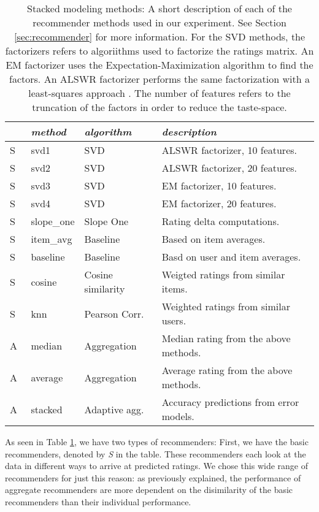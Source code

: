 \begin{table}[t]
  \begin{tabular*}{\textwidth}{ l l l l }
    \toprule
    ~ & \emph{method} &  \emph{algorithm} & \emph{description} \\
    \midrule
    S & svd1          & SVD                   & ALSWR factorizer, 10 features. \\
    S & svd2          & SVD                   & ALSWR factorizer, 20 features. \\
    S & svd3          & SVD                   & EM factorizer, 10 features. \\
    S & svd4          & SVD                   & EM factorizer, 20 features. \\
    S & slope\_one    & Slope One             & Rating delta computations. \\
    S & item\_avg     & Baseline              & Based on item averages. \\ 
    S & baseline      & Baseline              & Basd on user and item averages.\\ 
    S & cosine   	    & Cosine similarity     & Weigted ratings from similar items.\\ 
    S & knn       	  & Pearson Corr.         & Weighted ratings from similar users.\\
    \midrule
    A & median    	  & Aggregation           & Median rating from the above methods. \\
    A & average    	  & Aggregation           & Average rating from the above methods. \\
    A & stacked       & Adaptive agg.         & Accuracy predictions from error models. \\
    \bottomrule
  \end{tabular*}
  \caption[Stacked Modeling Methods]{
    Stacked modeling methods: A short description of each of the recommender methods
    used in our experiment. See Section \ref{sec:recommender} for more information.
    For the SVD methods, the factorizers refers to algoriithms used to factorize the ratings matrix.
    An EM factorizer uses the Expectation-Maximization algorithm to find the factors.
    An ALSWR factorizer performs the same factorization with a least-squares approach \citep{Zhou2008}.
    The number of features refers to the truncation of the factors in order to reduce the taste-space.
  }
  \label{table:results:methods}
\end{table}

As seen in Table \ref{table:results:methods}, we have two types of recommenders:
First, we have the basic recommenders, denoted by \emph{S} in the table.
These recommenders each look at the data in different ways to arrive at predicted ratings.
We chose this wide range of recommenders for just this reason:
as previously explained, the performance of aggregate recommenders
are more dependent on the disimilarity of the basic recommenders
than their individual performance.

